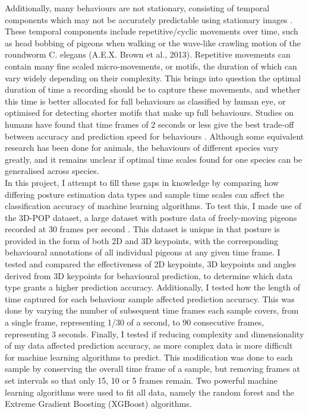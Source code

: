 \documentclass[11pt, letterpaper]{article} %
\begin{document}
    \noindent Additionally, many behaviours are not stationary, consisting of temporal components which may not be accurately predictable using stationary images \citep{datta_computational_2019}. These temporal components include repetitive/cyclic movements over time, such as head bobbing of pigeons when walking \citep{head-bobbing_1988} or the wave-like crawling motion of the roundworm C. elegans (A.E.X. Brown et al., 2013). Repetitive movements can contain many fine scaled micro-movements, or motifs, the duration of which can vary widely depending on their complexity. This brings into question the optimal duration of time a recording should be to capture these movements, and whether this time is better allocated for full behaviours as classified by human eye, or optimised for detecting shorter motifs that make up full behaviours. Studies on humans have found that time frames of 2 seconds or less give the best trade-off between accuracy and prediction speed for behaviours \citep{banos_window_2014}. Although some equivalent research has been done for animals, the behaviours of different species vary greatly, and it remains unclear if optimal time scales found for one species can be generalised across species. \\

    
    
    \noindent In this project, I attempt to fill these gaps in knowledge by comparing how differing posture estimation data types and sample time scales can affect the classification accuracy of machine learning algorithms. 
    To test this, I made use of the 3D-POP dataset, a large dataset with posture data of freely-moving pigeons recorded at 30 frames per second \citep{naik_3d-pop_2023}. This dataset is unique in that posture is provided in the form of both 2D and 3D keypoints, with the corresponding behavioural annotations of all individual pigeons at any given time frame. I tested and compared the effectiveness of 2D keypoints, 3D keypoints and angles derived from 3D keypoints for behavioural prediction, to determine which data type grants a higher prediction accuracy.
    Additionally, I tested how the length of time captured for each behaviour sample affected prediction accuracy. This was done by varying the number of subsequent time frames each sample covers, from a single frame, representing 1/30 of a second, to 90 consecutive frames, representing 3 seconds.
    Finally, I tested if reducing complexity and dimensionality of my data affected prediction accuracy, as more complex data is more difficult for machine learning algorithms to predict. This modification was done to each sample by conserving the overall time frame of a sample, but removing frames at set intervals so that only 15, 10 or 5 frames remain. 
    Two powerful machine learning algorithms were used to fit all data, namely the random forest \citep{breiman_randomforest_2001} and the Extreme Gradient Boosting (XGBoost) \citep{chen_xgboost_2016} algorithms.
    
\end{document}
